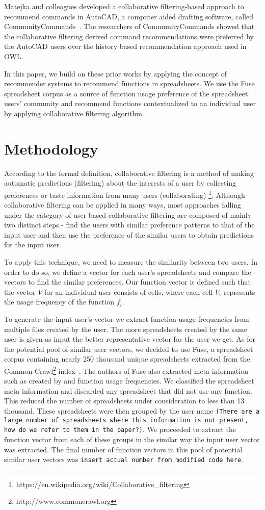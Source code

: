 \documentclass[conference]{IEEEtran}
\begin{document}
Matejka and colleagues developed a collaborative filtering-based approach to recommend commands in AutoCAD, a computer aided drafting software, called CommunityCommands~\cite{matejka2009communitycommands}. The researchers of CommunityCommands showed that the collaborative filtering derived command recommendations were preferred by the AutoCAD users over the history based recommendation approach used in OWL.

In this paper, we build on these prior works by applying the concept of recommender systems to recommend functions in spreadsheets. We use the Fuse spreadsheet corpus as a source of function usage preference of the spreadsheet users' community and recommend functions contextualized to an individual user by applying collaborative filtering algorithm.

\section{Methodology}
According to the formal definition, collaborative filtering is a method of making automatic predictions (filtering) about the interests of a user by collecting preferences or taste information from many users (collaborating) \footnote{https://en.wikipedia.org/wiki/Collaborative\_filtering}. Although collaborative filtering can be applied in many ways, most approaches falling under the category of user-based collaborative filtering are composed of mainly two distinct steps - find the users with similar preference patterns to that of the input user and then use the preference of the similar users to obtain predictions for the input user.

To apply this technique, we need to measure the similarity between two users. In order to do so, we define a vector for each user's spreadsheets and compare the vectors to find the similar preferences. Our function vector is defined such that the vector $V$ for an individual user consists of cells, where each cell $V_i$ represents the usage frequency of the function $f_i$.

To generate the input user's vector we extract function usage frequencies from multiple files created by the user. The more spreadsheets created by the same user is given as input the better representative vector for the user we get. As for the potential pool of similar user vectors, we decided to use Fuse, a spreadsheet corpus containing nearly 250 thousand unique spreadsheets extracted from the Common Crawl\footnote{http://www.commoncrawl.org} index~\cite{barik2015fuse}. The authors of Fuse also extracted meta information such as created by and function usage frequencies. We classified the spreadsheet meta information and discarded any spreadsheet that did not use any function. This reduced the number of spreadsheets under consideration to less than 13 thousand. These spreadsheets were then grouped by the user name \texttt{(There are a large number of spreadsheets where this information is not present, how do we refer to them in the paper?)}. We proceeded to extract the function vector from each of these groups in the similar way the input user vector was extracted. The final number of function vectors in this pool of potential similar user vectors was \texttt{insert actual number from modified code here}.
\end{document}
